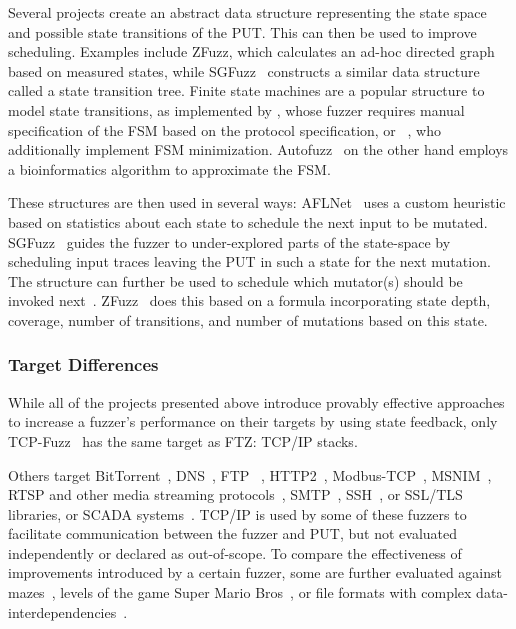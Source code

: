 \documentclass{article}
\newcommand{\proj}{FTZ\xspace}
\let\savedCite=\cite
\renewcommand{\cite}{\unskip~\savedCite}
\begin{document}
\begin{multicols}{2}
  Several projects create an abstract data structure representing the state space and possible state transitions of the PUT. This can then be used to improve scheduling. Examples include ZFuzz, which calculates an ad-hoc directed graph based on measured states, while SGFuzz\cite{SGFuzz} constructs a similar data structure called a state transition tree. Finite state machines are a popular structure to model state transitions, as implemented by \citeauthor{Congestion}, whose fuzzer requires manual specification of the FSM based on the protocol specification, or \citeauthor{ModelBased}\cite{ModelBased}, who additionally implement FSM minimization. Autofuzz\cite{Autofuzz} on the other hand employs a bioinformatics algorithm to approximate the FSM.

  These structures are then used in several ways: AFLNet\cite{AFLNET} uses a custom heuristic based on statistics about each state to schedule the next input to be mutated. SGFuzz\cite{SGFuzz} guides the fuzzer to under-explored parts of the state-space by scheduling input traces leaving the PUT in such a state for the next mutation. The structure can further be used to schedule which mutator(s) should be invoked next\cite{ModelBased}. ZFuzz\cite{ZFuzz} does this based on a formula incorporating state depth, coverage, number of transitions, and number of mutations based on this state.

  \subsubsection{Target Differences}

  While all of the projects presented above introduce provably effective approaches to increase a fuzzer's performance on their targets by using state feedback, only TCP-Fuzz\cite{TCPFuzz} has the same target as \proj: TCP/IP stacks.

  Others target BitTorrent\cite{Ankou}, DNS\cite{StateAFL}, FTP \cite{AFLNET, FitM, StateAFL, Autofuzz,ZFuzz}, HTTP2\cite{SGFuzz}, Modbus-TCP\cite{ModbusTCP,ModbusTCP2, GANFuzz, MTA, MTFStorm, AnotherModbusTCP}, MSNIM\cite{ModelBased}, RTSP and other media streaming protocols\cite{AFLNET, SGFuzz}, SMTP\cite{StateAFL}, SSH\cite{StateAFL}, or SSL/TLS\cite{SGFuzz,ZFuzz,DDFuzz} libraries, or SCADA systems\cite{EPF}. TCP/IP is used by some of these fuzzers to facilitate communication between the fuzzer and PUT, but not evaluated independently or declared as out-of-scope. To compare the effectiveness of improvements introduced by a certain fuzzer, some are further evaluated against mazes\cite{Ijon, SandPuppy}, levels of the game Super Mario Bros\cite{Ijon, SandPuppy}, or file formats with complex data-interdependencies\cite{Ijon, SandPuppy, DDFuzz, Ankou}.


\end{multicols}
\end{document}
